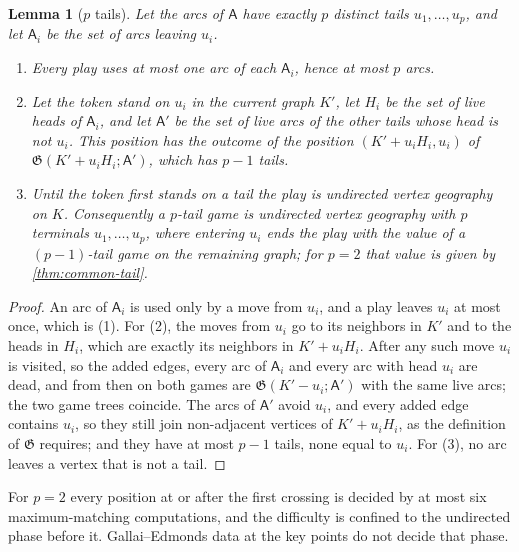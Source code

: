 \documentclass[11pt]{amsart}
\theoremstyle{plain}
\newtheorem{lemma}[theorem]{Lemma}
\theoremstyle{definition}
\theoremstyle{remark}
\numberwithin{equation}{section}
\newcommand{\game}{\mathfrak{G}}          %
\newcommand{\arcs}{\mathsf{A}}            %
\begin{document}
\begin{lemma}[$p$ tails]\label{lem:p-tails}
Let the arcs of $\arcs$ have exactly $p$ distinct tails $u_1,\dots,u_p$, and let $\arcs_i$ be the set of arcs leaving $u_i$.
\begin{enumerate}[label=\textup{(\arabic*)}]
\item Every play uses at most one arc of each $\arcs_i$, hence at most $p$ arcs.
\item Let the token stand on $u_i$ in the current graph $K'$, let $H_i$ be the set of live heads of $\arcs_i$, and let $\arcs'$ be the set of live arcs of the other tails whose head is not $u_i$. This position has the outcome of the position $(K'+u_iH_i,u_i)$ of $\game(K'+u_iH_i;\arcs')$, which has $p-1$ tails.
\item Until the token first stands on a tail the play is undirected vertex geography on $K$. Consequently a $p$-tail game is undirected vertex geography with $p$ terminals $u_1,\dots,u_p$, where entering $u_i$ ends the play with the value of a $(p-1)$-tail game on the remaining graph; for $p=2$ that value is given by \cref{thm:common-tail}.
\end{enumerate}
\end{lemma}
\begin{proof}
An arc of $\arcs_i$ is used only by a move from $u_i$, and a play leaves $u_i$ at most once, which is (1). For (2), the moves from $u_i$ go to its neighbors in $K'$ and to the heads in $H_i$, which are exactly its neighbors in $K'+u_iH_i$. After any such move $u_i$ is visited, so the added edges, every arc of $\arcs_i$ and every arc with head $u_i$ are dead, and from then on both games are $\game(K'-u_i;\arcs')$ with the same live arcs; the two game trees coincide. The arcs of $\arcs'$ avoid $u_i$, and every added edge contains $u_i$, so they still join non-adjacent vertices of $K'+u_iH_i$, as the definition of $\game$ requires; and they have at most $p-1$ tails, none equal to $u_i$. For (3), no arc leaves a vertex that is not a tail.
\end{proof}

For $p=2$ every position at or after the first crossing is decided by at most six maximum-matching computations, and the difficulty is confined to the undirected phase before it. Gallai--Edmonds data at the key points do not decide that phase.
\end{document}
